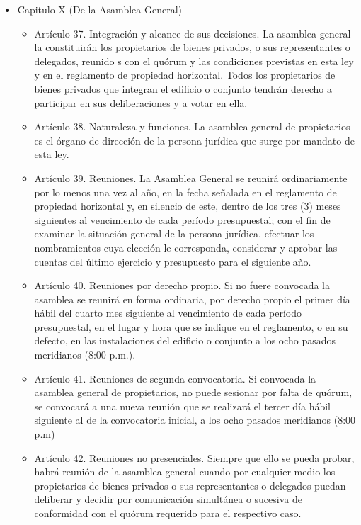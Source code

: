 \begin{itemize}
\item Capitulo X (De la Asamblea General)
\begin{itemize}

\item Artículo 37. Integración y alcance de sus decisiones. La asamblea general la constituirán los propietarios de bienes privados, o sus representantes o delegados, reunido s con el quórum y las condiciones previstas en esta ley y en el reglamento de propiedad horizontal. Todos los propietarios de bienes privados que integran el edificio o conjunto tendrán derecho a participar en sus deliberaciones y a votar en ella. 

\item Artículo 38. Naturaleza y funciones. La asamblea general de propietarios es el órgano de dirección de la persona jurídica que surge por mandato de esta ley.

\item Artículo 39. Reuniones. La Asamblea General se reunirá ordinariamente por lo menos una vez al año, en la fecha señalada en el reglamento de propiedad horizontal y, en silencio de este, dentro de los tres (3) meses siguientes al vencimiento de cada período presupuestal; con el fin de examinar la situación general de la persona jurídica, efectuar los nombramientos cuya elección le corresponda, considerar y aprobar las cuentas del último ejercicio y presupuesto para el siguiente año. 

\item Artículo 40. Reuniones por derecho propio. Si no fuere convocada la asamblea se reunirá en forma ordinaria, por derecho propio el primer día hábil del cuarto mes siguiente al vencimiento de cada período presupuestal, en el lugar y hora que se indique en el reglamento, o en su defecto, en las instalaciones del edificio o conjunto a los ocho pasados meridianos (8:00 p.m.). 

\item Artículo 41. Reuniones de segunda convocatoria. Si convocada la asamblea general de propietarios, no puede sesionar por falta de quórum, se convocará a una nueva reunión que se realizará el tercer día hábil siguiente al de la convocatoria inicial, a los ocho pasados meridianos (8:00 p.m)

\item Artículo 42. Reuniones no presenciales. Siempre que ello se pueda probar, habrá reunión de la asamblea general cuando por cualquier medio los propietarios de bienes privados o sus representantes o delegados puedan deliberar y decidir por comunicación simultánea o sucesiva de conformidad con el quórum requerido para el respectivo caso. 


\end{itemize}
\end{itemize}
